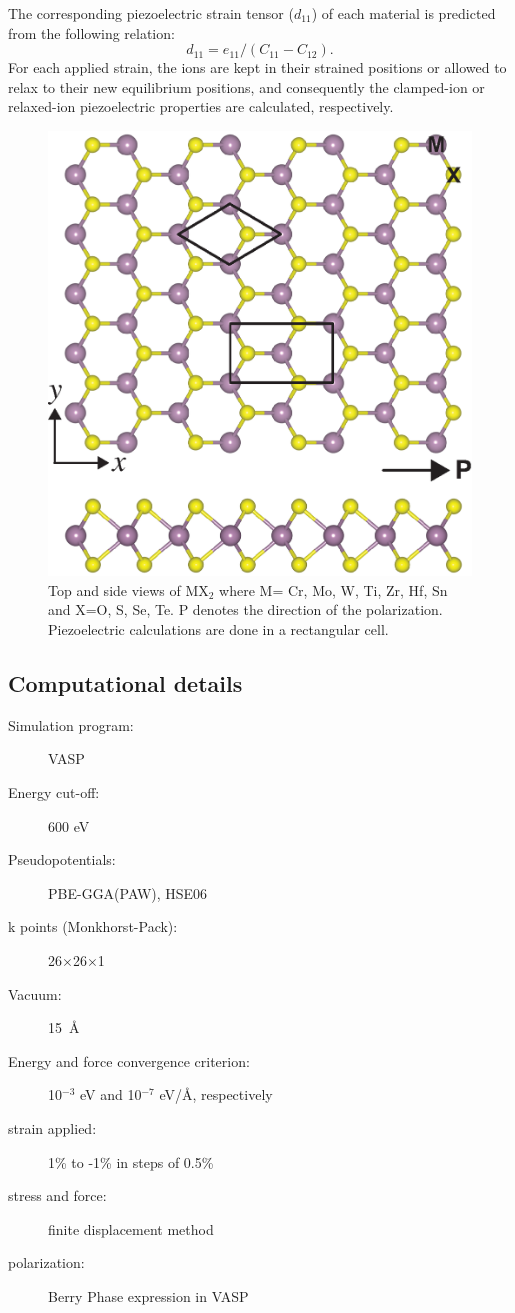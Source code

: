 The corresponding piezoelectric strain tensor ($d_{11}$) of each material is predicted from the following relation\cite{Duerloo2012}:
\begin{equation}\label{eq:d11}
                d_{11}= e_{11}/( C_{11} - C_{12} ).
\end{equation}
For each applied strain, the ions are kept in their strained positions or allowed to relax to their new equilibrium positions, and consequently the clamped-ion or relaxed-ion piezoelectric properties are calculated, respectively.

\begin{figure}[htbp]
\centering
	\includegraphics[width=0.5\linewidth]{mx2_str.eps}
	\caption{Top and side views of MX$_2$ where M= Cr,  Mo, W, Ti, Zr, Hf, Sn and X=O, S, Se, Te. P denotes the direction of the polarization. Piezoelectric calculations are done in a rectangular cell. \label{fig:mx2_str}}
\end{figure}

\subsection{Computational details}
\begin{footnotesize}
\begin{description}
\item[Simulation program:] VASP
\item[Energy cut-off:] 600 eV
\item[Pseudopotentials:] PBE-GGA(PAW), HSE06
\item[k points (Monkhorst-Pack):] 26$\times$26$\times$1
\item[Vacuum:] 15~\AA
\item[Energy and force convergence criterion:] 10$^{-3}$ eV and 10$^{-7}$ eV/\AA, respectively
\item[strain applied:] 1\% to -1\% in steps of 0.5\%
\item[stress and force:] finite displacement method
\item[polarization:] Berry Phase expression \cite{vanderbilt2000} in VASP
\end{description}
\end{footnotesize}

